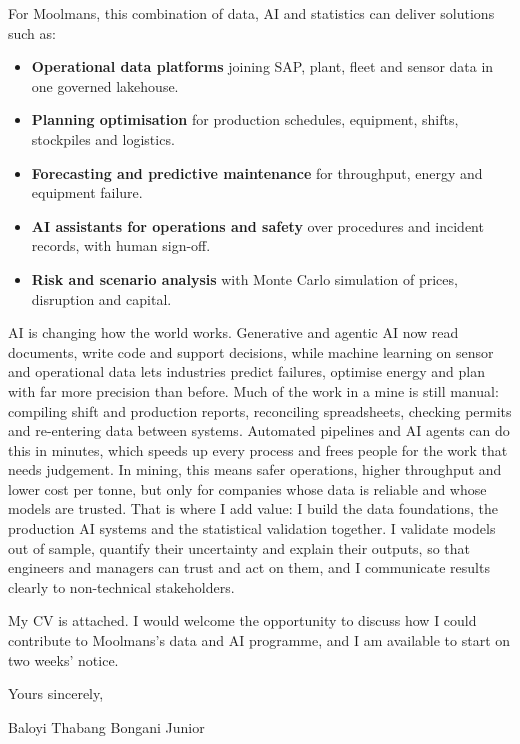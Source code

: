 \documentclass[a4paper,11pt]{article}
\begin{document}
For Moolmans, this combination of data, AI and statistics can deliver solutions such as:
\begin{itemize}[leftmargin=0.2in,itemsep=1pt,topsep=0pt]
    \item \textbf{Operational data platforms} joining SAP, plant, fleet and sensor data in one governed lakehouse.
    \item \textbf{Planning optimisation} for production schedules, equipment, shifts, stockpiles and logistics.
    \item \textbf{Forecasting and predictive maintenance} for throughput, energy and equipment failure.
    \item \textbf{AI assistants for operations and safety} over procedures and incident records, with human sign-off.
    \item \textbf{Risk and scenario analysis} with Monte Carlo simulation of prices, disruption and capital.
\end{itemize}

AI is changing how the world works. Generative and agentic AI now read documents, write code and
support decisions, while machine learning on sensor and operational data lets industries predict
failures, optimise energy and plan with far more precision than before. Much of the work in a mine is
still manual: compiling shift and production reports, reconciling spreadsheets, checking permits and
re-entering data between systems. Automated pipelines and AI agents can do this in minutes, which speeds
up every process and frees people for the work that needs judgement. In mining, this means safer
operations, higher throughput and lower cost per tonne, but only for companies whose data is reliable
and whose models are trusted. That is where I add value: I build the data foundations, the production
AI systems and the statistical validation together. I validate models out of sample, quantify their
uncertainty and explain their outputs, so that engineers and managers can trust and act on them, and
I communicate results clearly to non-technical stakeholders.

My CV is attached. I would welcome the opportunity to discuss how I could contribute to Moolmans's data and
AI programme, and I am available to start on two weeks' notice.

Yours sincerely,

\vspace{2pt}
Baloyi Thabang Bongani Junior
\end{document}
